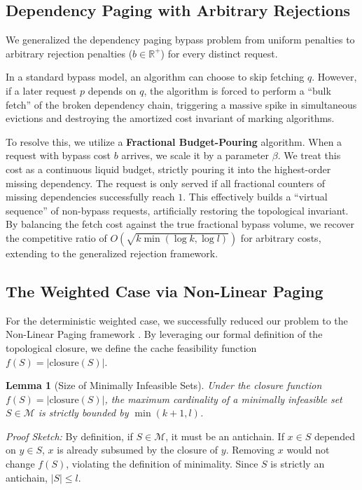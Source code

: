 \documentclass[a4paper,11pt]{article}
\newtheorem{lemma}{Lemma}
\begin{document}
\subsection{Dependency Paging with Arbitrary Rejections}
We generalized the dependency paging bypass problem from uniform penalties to arbitrary rejection penalties ($b \in \mathbb{R}^+$) for every distinct request. 

In a standard bypass model, an algorithm can choose to skip fetching $q$. However, if a later request $p$ depends on $q$, the algorithm is forced to perform a ``bulk fetch'' of the broken dependency chain, triggering a massive spike in simultaneous evictions and destroying the amortized cost invariant of marking algorithms.

To resolve this, we utilize a \textbf{Fractional Budget-Pouring} algorithm. When a request with bypass cost $b$ arrives, we scale it by a parameter $\beta$. We treat this cost as a continuous liquid budget, strictly pouring it into the highest-order missing dependency. The request is only served if all fractional counters of missing dependencies successfully reach $1$. This effectively builds a ``virtual sequence'' of non-bypass requests, artificially restoring the topological invariant. By balancing the fetch cost against the true fractional bypass volume, we recover the competitive ratio of $O\left(\sqrt{k \min(\log k, \log l)}\right)$ for arbitrary costs, extending \cite{dallot2024dependency} to the generalized rejection framework.

\subsection{The Weighted Case via Non-Linear Paging}
For the deterministic weighted case, we successfully reduced our problem to the Non-Linear Paging framework \cite{DoronAradetal2024}. By leveraging our formal definition of the topological closure, we define the cache feasibility function $f(S) = |\text{closure}(S)|$.

\begin{lemma}[Size of Minimally Infeasible Sets]
Under the closure function $f(S) = |\text{closure}(S)|$, the maximum cardinality of a minimally infeasible set $S \in \mathcal{M}$ is strictly bounded by $\min(k+1, l)$.
\end{lemma}
\textit{Proof Sketch:} By definition, if $S \in \mathcal{M}$, it must be an antichain. If $x \in S$ depended on $y \in S$, $x$ is already subsumed by the closure of $y$. Removing $x$ would not change $f(S)$, violating the definition of minimality. Since $S$ is strictly an antichain, $|S| \le l$.
\end{document}
